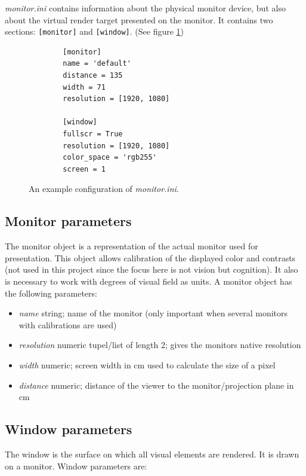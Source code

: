 \documentclass[12pt,a4paper]{book}
\begin{document}
\textit{monitor.ini} contains information about the physical monitor device, but also about the virtual render target presented on the monitor. It contains two sections: \verb|[monitor]| and \verb|[window]|. (See figure \ref{fig:monitorini})

\begin{figure}
	\begin{framed}
		\begin{verbatim}
		[monitor]
		name = 'default'
		distance = 135
		width = 71
		resolution = [1920, 1080]
		
		[window]
		fullscr = True
		resolution = [1920, 1080]
		color_space = 'rgb255'
		screen = 1
		\end{verbatim}
	\end{framed}
	\caption{An example configuration of \textit{monitor.ini}.}
	\label{fig:monitorini}
\end{figure}

\subsection{Monitor parameters}

The monitor object is a representation of the actual monitor used for presentation. This object allows calibration of the displayed color and contrasts (not used in this project since the focus here is not vision but cognition). It also is necessary to work with degrees of visual field as units. A monitor object has the following parameters:

\begin{itemize}
\item \emph{name} string; name of the monitor (only important when several monitors with calibrations are used)
\item \emph{resolution} numeric tupel/list of length 2; gives the monitors native resolution
\item \emph{width} numeric; screen width in cm used to calculate the size of a pixel
\item \emph{distance} numeric; distance of the viewer to the monitor/projection plane in cm
\end{itemize}

\subsection{Window parameters}\label{sec:window_par}

The window is the surface on which all visual elements are rendered. It is drawn on a monitor. Window parameters are:
\end{document}

